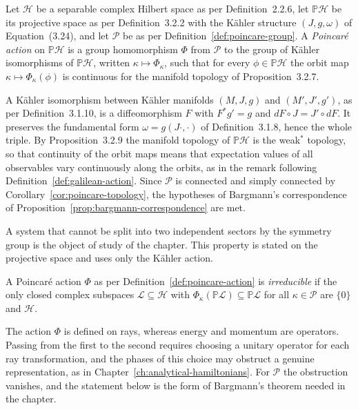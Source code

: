 \begin{definition}\label{def:poincare-action}
	Let $\mathcal{H}$ be a separable complex Hilbert space as per Definition~2.2.6, let $\mathbb{P}\mathcal{H}$ be its projective space as per Definition~3.2.2 with the Kähler structure $(J,g,\omega)$ of Equation~(3.24), and let $\mathcal{P}$ be as per Definition~\ref{def:poincare-group}. A \emph{Poincar\'e action} on $\mathbb{P}\mathcal{H}$ is a group homomorphism $\Phi$ from $\mathcal{P}$ to the group of Kähler isomorphisms of $\mathbb{P}\mathcal{H}$, written $\kappa\mapsto\Phi_\kappa$, such that for every $\phi\in\mathbb{P}\mathcal{H}$ the orbit map $\kappa\mapsto\Phi_\kappa(\phi)$ is continuous for the manifold topology of Proposition~3.2.7.
\end{definition}

\begin{remark}
	A Kähler isomorphism between Kähler manifolds $(M,J,g)$ and $(M',J',g')$, as per Definition~3.1.10, is a diffeomorphism $F$ with $F^*g'=g$ and $dF\circ J=J'\circ dF$. It preserves the fundamental form $\omega=g(J\cdot,\cdot)$ of Definition~3.1.8, hence the whole triple. By Proposition~3.2.9 the manifold topology of $\mathbb{P}\mathcal{H}$ is the weak$^*$ topology, so that continuity of the orbit maps means that expectation values of all observables vary continuously along the orbits, as in the remark following Definition~\ref{def:galilean-action}. Since $\mathcal{P}$ is connected and simply connected by Corollary~\ref{cor:poincare-topology}, the hypotheses of Bargmann's correspondence of Proposition~\ref{prop:bargmann-correspondence} are met.
\end{remark}

A system that cannot be split into two independent sectors by the symmetry group is the object of study of the chapter. This property is stated on the projective space and uses only the Kähler action.

\begin{definition}\label{def:poincare-irreducible}
	A Poincar\'e action $\Phi$ as per Definition~\ref{def:poincare-action} is \emph{irreducible} if the only closed complex subspaces $\mathcal{L}\subseteq\mathcal{H}$ with $\Phi_\kappa(\mathbb{P}\mathcal{L})\subseteq\mathbb{P}\mathcal{L}$ for all $\kappa\in\mathcal{P}$ are $\{0\}$ and $\mathcal{H}$.
\end{definition}

The action $\Phi$ is defined on rays, whereas energy and momentum are operators. Passing from the first to the second requires choosing a unitary operator for each ray transformation, and the phases of this choice may obstruct a genuine representation, as in Chapter~\ref{ch:analytical-hamiltonians}. For $\mathcal{P}$ the obstruction vanishes, and the statement below is the form of Bargmann's theorem needed in the chapter.

